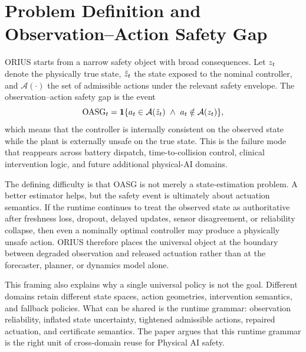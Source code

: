 \section{Problem Definition and Observation--Action Safety Gap}
\label{sec:ieee-oasg}

ORIUS starts from a narrow safety object with broad consequences. Let $z_t$ denote the
physically true state, $\tilde{z}_t$ the state exposed to the nominal controller, and
$\mathcal{A}(\cdot)$ the set of admissible actions under the relevant safety envelope.
The observation--action safety gap is the event
\[
\OASG_t = \mathbf{1}\{a_t \in \mathcal{A}(\ztt)\ \land\ a_t \notin \mathcal{A}(\zt)\},
\]
which means that the controller is internally consistent on the observed state while
the plant is externally unsafe on the true state. This is the failure mode that
reappears across battery dispatch, time-to-collision control, clinical intervention
logic, and future additional physical-AI domains.

The defining difficulty is that OASG is not merely a state-estimation problem. A better
estimator helps, but the safety event is ultimately about actuation semantics. If the
runtime continues to treat the observed state as authoritative after freshness loss,
dropout, delayed updates, sensor disagreement, or reliability collapse, then even a
nominally optimal controller may produce a physically unsafe action. ORIUS therefore
places the universal object at the boundary between degraded observation and released
actuation rather than at the forecaster, planner, or dynamics model alone.

This framing also explains why a single universal policy is not the goal. Different
domains retain different state spaces, action geometries, intervention semantics, and
fallback policies. What can be shared is the runtime grammar: observation reliability,
inflated state uncertainty, tightened admissible actions, repaired actuation, and
certificate semantics. The paper argues that this runtime grammar is the right unit of
cross-domain reuse for Physical AI safety.

